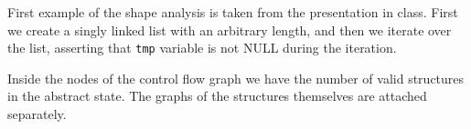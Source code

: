 First example of the shape analysis is taken from the presentation in class. First we create a singly linked list with an arbitrary length, and then we iterate over the list, asserting that \texttt{tmp} variable is not NULL during the iteration.

Inside the nodes of the control flow graph we have the number of valid structures in the abstract state. The graphs of the structures themselves are attached separately.

